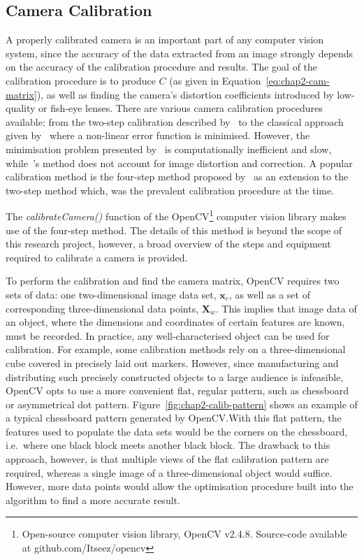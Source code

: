 \subsection{Camera Calibration}
\label{sec:chap2-cam-calibration}

A properly calibrated camera is an important part of any computer vision system, since the accuracy of the data extracted from an image strongly depends on the accuracy of the calibration procedure and results. The goal of the calibration procedure is to produce $C$ (as given in Equation~\ref{eq:chap2-cam-matrix}), as well as finding the camera's distortion coefficients introduced by low-quality or fish-eye lenses. There are various camera calibration procedures available: from the two-step calibration described by~\cite{melen1994geometrical} to the classical approach given by~\cite{slama1980manual} where a non-linear error function is minimised. However, the minimisation problem presented by~\citeauthor{slama1980manual} is computationally inefficient and slow, while~\citeauthor{melen1994geometrical}'s method does not account for image distortion and correction. A popular calibration method is the four-step method proposed by~\cite{heikkila1997four} as an extension to the two-step method which, was the prevalent calibration procedure at the time.

The \emph{calibrateCamera()} function of the OpenCV\footnote{Open-source computer vision library, OpenCV v2.4.8. Source-code available at github.com/Itseez/opencv} computer vision library \citep{bradski2000opencv} makes use of the four-step method. The details of this method is beyond the scope of this research project, however, a broad overview of the steps and equipment required to calibrate a camera is provided. 

To perform the calibration and find the camera matrix, OpenCV requires two sets of data: one two-dimensional image data set, $\bm{x}_c$, as well as a set of corresponding three-dimensional data points, $\bm{X}_w$. This implies that image data of an object, where the dimensions and coordinates of certain features are known, must be recorded. In practice, any well-characterised object can be used for calibration. For example, some calibration methods rely on a three-dimensional cube covered in precisely laid out markers. However, since manufacturing and distributing such precisely constructed objects to a large audience is infeasible, OpenCV opts to use a more convenient flat, regular pattern, such as chessboard or asymmetrical dot pattern. Figure~\ref{fig:chap2-calib-pattern} shows an example of a typical chessboard pattern generated by OpenCV.\@ With this flat pattern, the features used to populate the data sets would be the corners on the chessboard, i.e.\ where one black block meets another black block. The drawback to this approach, however, is that multiple views of the flat calibration pattern are required, whereas a single image of a three-dimensional object would suffice. However, more data points would allow the optimisation procedure built into the algorithm to find a more accurate result.  

